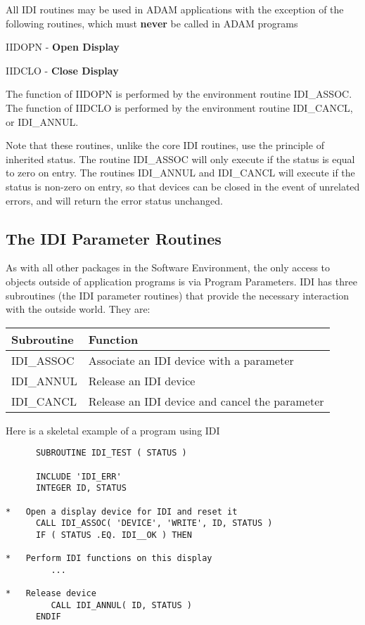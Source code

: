 All IDI routines may be used in ADAM applications with the exception of
the following routines, which must {\bf never} be called in ADAM programs

\hspace*{20mm}\begin{minipage}{140mm}

\noindent
IIDOPN - {\bf Open Display}

\noindent
IIDCLO - {\bf Close Display}

\end{minipage}

The function of IIDOPN is performed by the environment routine IDI\_ASSOC.
The function of IIDCLO is performed by the environment routine IDI\_CANCL,
or IDI\_ANNUL.

Note that these routines, unlike the core IDI routines, use the principle
of inherited status. The routine IDI\_ASSOC will only execute if the
status is equal to zero on entry. The routines IDI\_ANNUL and IDI\_CANCL
will execute if the status is non-zero on entry, so that devices can be
closed in the event of unrelated errors, and will return the error
status unchanged.

\subsection{The IDI Parameter Routines}

As with all other packages in the Software Environment, the only access to
objects outside of application programs is via Program Parameters. IDI has
three subroutines (the IDI parameter routines) that provide the
necessary interaction with the outside world. They are:

\begin{center}
\begin{tabular}{|l|l|} \hline
Subroutine & Function \\ \hline
IDI\_ASSOC & Associate an IDI device with a parameter \\
IDI\_ANNUL & Release an IDI device \\
IDI\_CANCL & Release an IDI device and cancel the parameter \\ \hline
\end{tabular}
\end{center}

Here is a skeletal example of a program using IDI
\begin{small}
\begin{verbatim}
      SUBROUTINE IDI_TEST ( STATUS )

      INCLUDE 'IDI_ERR'
      INTEGER ID, STATUS

*   Open a display device for IDI and reset it
      CALL IDI_ASSOC( 'DEVICE', 'WRITE', ID, STATUS )
      IF ( STATUS .EQ. IDI__OK ) THEN

*   Perform IDI functions on this display
         ...

*   Release device
         CALL IDI_ANNUL( ID, STATUS )
      ENDIF
\end{verbatim}
\end{small}

